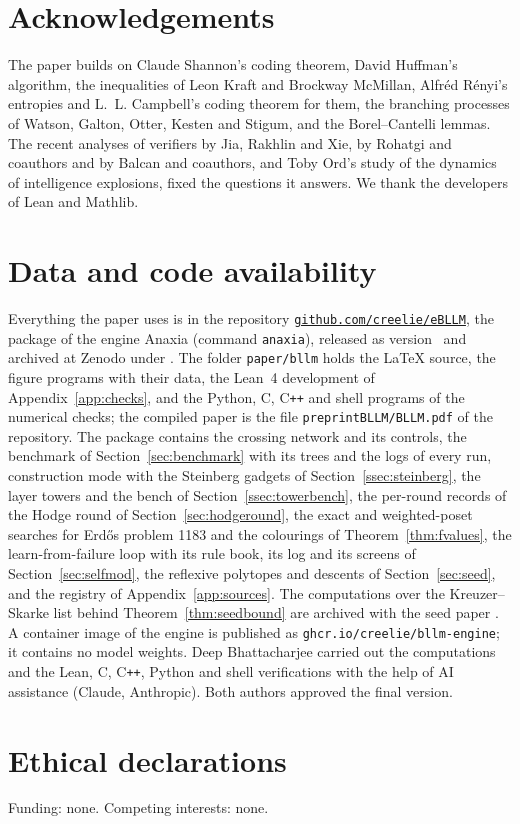 \section*{Acknowledgements}
The paper builds on Claude Shannon's coding theorem, David Huffman's algorithm, the inequalities of Leon Kraft and Brockway McMillan, Alfr\'ed R\'enyi's entropies and L.~L. Campbell's coding theorem for them, the branching processes of Watson, Galton, Otter, Kesten and Stigum, and the Borel--Cantelli lemmas. The recent analyses of verifiers by Jia, Rakhlin and Xie, by Rohatgi and coauthors and by Balcan and coauthors, and Toby Ord's study of the dynamics of intelligence explosions, fixed the questions it answers. We thank the developers of Lean and Mathlib.

\section*{Data and code availability}
Everything the paper uses is in the repository \href{https://github.com/creelie/eBLLM}{\nolinkurl{github.com/creelie/eBLLM}}, the package of the engine Anaxia (command \texttt{anaxia}), released as version~\anaxiaVersion{} and archived at Zenodo under \anaxiaDOIlink{} \cite{Bha26c}. The folder \texttt{paper/bllm} holds the \LaTeX{} source, the figure programs with their data, the Lean~4 development of Appendix~\ref{app:checks}, and the Python, C, C\texttt{++} and shell programs of the numerical checks; the compiled paper is the file \texttt{preprintBLLM/BLLM.pdf} of the repository. The package contains the crossing network and its controls, the benchmark of Section~\ref{sec:benchmark} with its trees and the logs of every run, construction mode with the Steinberg gadgets of Section~\ref{ssec:steinberg}, the layer towers and the bench of Section~\ref{ssec:towerbench}, the per-round records of the Hodge round of Section~\ref{sec:hodgeround}, the exact and weighted-poset searches for Erd\H{o}s problem 1183 and the colourings of Theorem~\ref{thm:fvalues}, the learn-from-failure loop with its rule book, its log and its screens of Section~\ref{sec:selfmod}, the reflexive polytopes and descents of Section~\ref{sec:seed}, and the registry of Appendix~\ref{app:sources}. The computations over the Kreuzer--Skarke list behind Theorem~\ref{thm:seedbound} are archived with the seed paper \cite{BhaSeed}. A container image of the engine is published as \texttt{ghcr.io/creelie/bllm-engine}; it contains no model weights. Deep Bhattacharjee carried out the computations and the Lean, C, C\texttt{++}, Python and shell verifications with the help of AI assistance (Claude, Anthropic). Both authors approved the final version.

\section*{Ethical declarations}
Funding: none. Competing interests: none.
